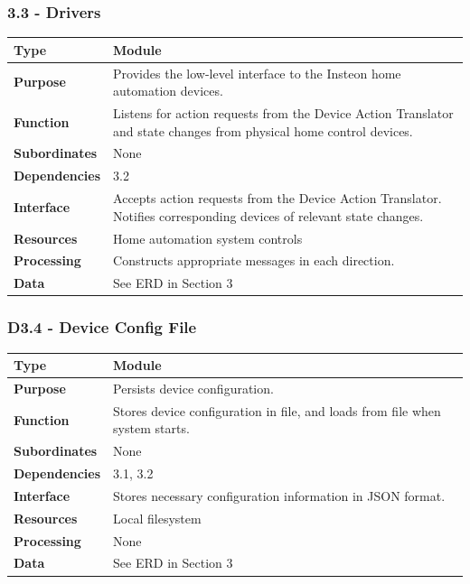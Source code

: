 \documentclass{article}
\begin{document}
\subsubsection*{3.3 - Drivers}
\begin{tabular}{ | l |  p{13.3cm} |}
\hline
\textbf{Type} & Module \\ \hline
\textbf{Purpose} & Provides the low-level interface to the Insteon home
automation devices. \\ \hline
\textbf{Function} & Listens for action requests from the Device Action Translator and state changes
from physical home control devices. \\ \hline
\textbf{Subordinates} & None \\ \hline
\textbf{Dependencies} & 3.2 \\ \hline
\textbf{Interface} & Accepts action requests from the Device Action Translator. Notifies
corresponding devices of relevant state changes. \\ \hline
\textbf{Resources} & Home automation system controls \\ \hline
\textbf{Processing} & Constructs appropriate messages in each direction. \\ \hline
\textbf{Data} & See ERD in Section 3 \\ \hline
\end{tabular}

\subsubsection*{D3.4 - Device Config File}
\begin{tabular}{ | l |  p{13.3cm} |}
\hline
\textbf{Type} & Module \\ \hline
\textbf{Purpose} & Persists device configuration. \\ \hline
\textbf{Function} & Stores device configuration in file, and loads from file
when system starts. \\ \hline
\textbf{Subordinates} & None \\ \hline
\textbf{Dependencies} & 3.1, 3.2 \\ \hline
\textbf{Interface} & Stores necessary configuration information in JSON
format. \\ \hline
\textbf{Resources} & Local filesystem \\ \hline
\textbf{Processing} & None \\ \hline
\textbf{Data} & See ERD in Section 3 \\ \hline
\end{tabular}
\end{document}
